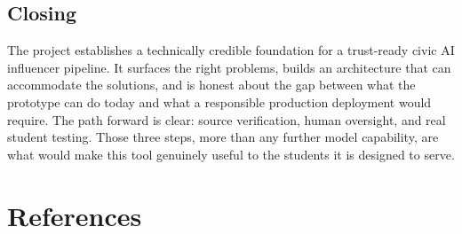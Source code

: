 \documentclass[12pt, letterpaper]{article}
\begin{document}
\subsection{Closing}

The project establishes a technically credible foundation for a trust-ready civic AI
influencer pipeline. It surfaces the right problems, builds an architecture that can
accommodate the solutions, and is honest about the gap between what the prototype
can do today and what a responsible production deployment would require. The path
forward is clear: source verification, human oversight, and real student testing. Those
three steps, more than any further model capability, are what would make this tool
genuinely useful to the students it is designed to serve.

\newpage

\section*{References}
\end{document}
